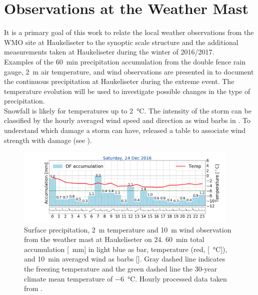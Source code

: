 \section{Observations at the Weather Mast}
\label{sec:loc_obs}
It is a primary goal of this work to relate the local weather observations from the WMO site at Haukeliseter to the synoptic scale structure and the additional measurements taken at Haukeliseter during the winter of 2016/2017.
\\
Examples of the \SI{60}{\minute} precipitation accumulation from the double fence rain gauge, \SI{2}{\metre} air temperature, and wind observations are presented in  to document the continuous precipitation at Haukeliseter during the extreme event. The temperature evolution will be used to investigate possible changes in the type of precipitation. 
\\
Snowfall is likely for temperatures up to \SI{2}{\celsius}. The intensity of the storm can be classified by the hourly averaged wind speed and direction as wind barbs in \SI{}{\mPs}.
To understand which damage a storm can have, \cite{faeraas_urd_2016} released a table to associate wind strength with damage (see ).
 \begin{figure}[H]
 	\centering
		\includegraphics[trim={4.9cm 1.cm 1.5cm 1cm},clip,
		width=0.95\textwidth]{./fig_weathermast/T_P_U_20161224}
 \caption{Surface precipitation, \SI{2}{\metre} temperature and \SI{10}{\metre} wind observation from the weather mast at Haukeliseter on \SI{24}{\dec}. \SI{60}{\minute} total accumulation [\SI{}{\mm}] in light blue as bar, temperature (red, [\SI{}{\celsius}]), and \SI{10}{\minute} averaged wind as barbs [\SI{}{\mPs}]. Gray dashed line indicates the freezing temperature and the green dashed line the 30-year climate mean temperature of \SI{-6}{\celsius}. Hourly processed data taken from \cite{eklima_norwegian_2016}.} \label{fig:TPU24_pres}
 \end{figure}
